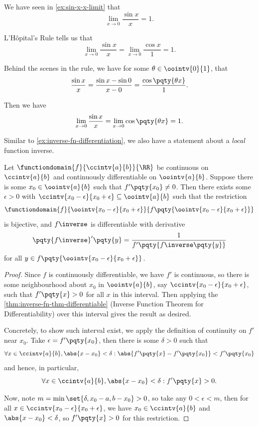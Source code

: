 \begin{example}
    \label{ex:l-hopitals}%
    We have seen in \autoref{ex:sin-x-x-limit} that
    \[
        \lim_{x \to 0} \frac{\sin x}{x} = 1.
    \]

    L'H\^{o}pital's Rule tells us that
    \[
        \lim_{x \to 0} \frac{\sin x}{x} = \lim_{x \to 0} \frac{\cos x}{1} = 1.
    \]

    Behind the scenes in the rule, we have for some \(\theta \in \oointv{0}{1}\), that
    \[
        \frac{\sin x}{x} = \frac{\sin x - \sin 0}{x - 0} = \frac{\cos \pqty{\theta x}}{1}.
    \]
    
    Then we have
    \[
        \lim_{x \to 0} \frac{\sin x}{x} = \lim_{x \to 0} \cos \pqty{\theta x} = 1.
    \]
\end{example}

Similar to \autoref{ex:inverse-fn-differentiation}, we also have a statement about a \emph{local} function inverse.

\begin{proposition}
    \label{prop:local-ivt}%
    Let \(\functiondomain{f}{\ccintv{a}{b}}{\RR}\) be continuous on \(\ccintv{a}{b}\) and continuously differentiable on \(\oointv{a}{b}\). Suppose there is some \(x_0 \in \oointv{a}{b}\) such that \(f'\pqty{x_0} \neq 0\). Then there exists some \(\epsilon > 0\) with \(\ccintv{x_0 - \epsilon}{x_0 + \epsilon} \subseteq \oointv{a}{b}\) such that the restriction
    \[
        \functiondomain{f}{\oointv{x_0 - \epsilon}{x_0 + \epsilon}}{f\pqty{\oointv{x_0 - \epsilon}{x_0 + \epsilon}}}
    \]
    is bijective, and \(f\inverse\) is differentiable with derivative
    \[
        \pqty{f\inverse}'\pqty{y} = \frac{1}{f'\pqty{f\inverse\pqty{y}}}
    \]
    for all \(y \in f\pqty{\oointv{x_0 - \epsilon}{x_0 + \epsilon}}\).
\end{proposition}

\begin{proof}
    Since \(f\) is continuously differentiable, we have \(f'\) is continuous, so there is some neighbourhood about \(x_0\) in \(\oointv{a}{b}\), say \(\ccintv{x_0 - \epsilon}{x_0 + \epsilon}\), such that \(f'\pqty{x} > 0\) for all \(x\) in this interval. Then applying the \autoref{thm:inverse-fn-thm-differentiable} (Inverse Function Theorem for Differentiability) over this interval gives the result as desired.

    Concretely, to show such interval exist, we apply the definition of continuity on \(f'\) near \(x_0\). Take \(\epsilon = f'\pqty{x_0}\), then there is some \(\delta > 0\) such that
    \[
        \forall x \in \ccintv{a}{b}, \abs{x - x_0} < \delta: \abs{f'\pqty{x} - f'\pqty{x_0}} < f'\pqty{x_0}
    \]
    and hence, in particular,
    \[
        \forall x \in \ccintv{a}{b}, \abs{x - x_0} < \delta: f'\pqty{x} > 0.
    \]

    Now, note \(m = \min\set{\delta, x_0 - a, b - x_0} > 0\), so take any \(0 < \epsilon < m\), then for all \(x \in \ccintv{x_0 - \epsilon}{x_0 + \epsilon}\), we have \(x_0 \in \ccintv{a}{b}\) and \(\abs{x - x_0} < \delta\), so \(f'\pqty{x} > 0\) for this restriction.
\end{proof}


